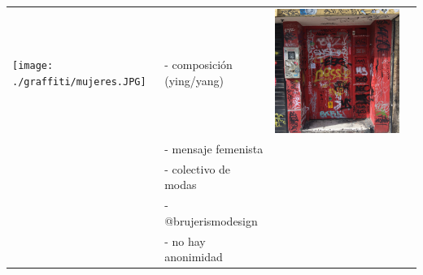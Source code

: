 \documentclass[11pt]{article}
\begin{document}
\begin{center}
\begin{tabular}{llll}
\texttt{[image: ./graffiti/mujeres.JPG]} & - composición (ying/yang) & \includegraphics[width=.9\linewidth]{./graffitti/gffti3.JPG} & \\
 & - mensaje femenista &  & \\
 & - colectivo de modas &  & \\
 & - @brujerismodesign &  & \\
 & - no hay anonimidad &  & \\
\hline

\end{tabular}
\end{center}
\end{document}
